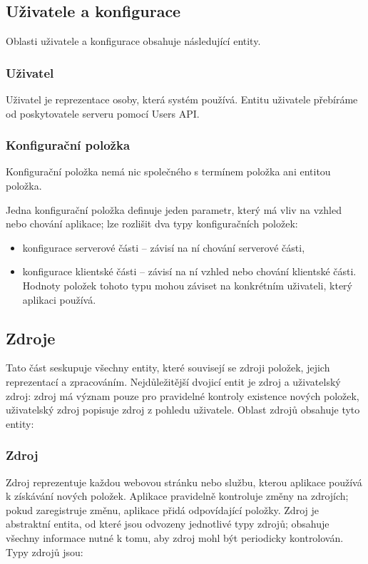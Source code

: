 \subsection{Uživatele a konfigurace}

Oblasti uživatele a konfigurace obsahuje následující entity.

\subsubsection{Uživatel}

Uživatel je reprezentace osoby, která systém používá.
Entitu uživatele přebíráme od poskytovatele serveru pomocí Users API.

\subsubsection{Konfigurační položka}

Konfigurační položka nemá nic společného s termínem položka ani entitou položka.

Jedna konfigurační položka definuje jeden parametr, který má vliv na vzhled nebo chování aplikace; lze rozlišit dva typy konfiguračních položek:
\begin{itemize}
	\item konfigurace serverové části -- závisí na ní chování serverové části,
	\item konfigurace klientské části -- závisí na ní vzhled nebo chování klientské části.
		Hodnoty položek tohoto typu mohou záviset na konkrétním uživateli, který aplikaci používá.
\end{itemize}

\subsection{Zdroje}

Tato část seskupuje všechny entity, které souvisejí se zdroji položek, jejich reprezentací a zpracováním.
Nejdůležitější dvojicí entit je zdroj a uživatelský zdroj: zdroj má význam pouze pro pravidelné kontroly existence nových položek, uživatelský zdroj popisuje zdroj z pohledu uživatele.
Oblast zdrojů obsahuje tyto entity:

\subsubsection{Zdroj}
\label{sss:zdroj}

Zdroj reprezentuje každou webovou stránku nebo službu, kterou aplikace používá k získávání nových položek.
Aplikace pravidelně kontroluje změny na zdrojích; pokud zaregistruje změnu, aplikace přidá odpovídající položky.
Zdroj je abstraktní entita, od které jsou odvozeny jednotlivé typy zdrojů; obsahuje všechny informace nutné k tomu, aby zdroj mohl být periodicky kontrolován.
Typy zdrojů jsou:

